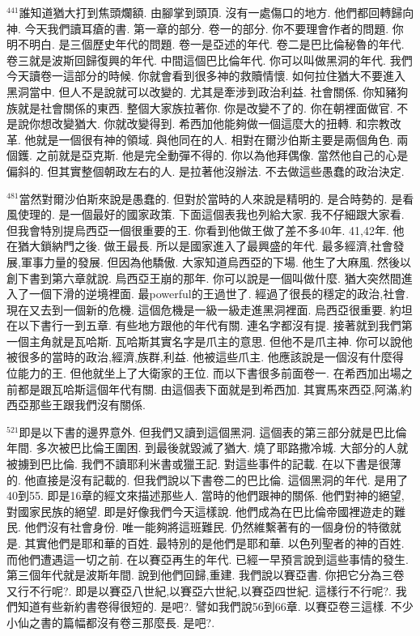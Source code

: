 \documentclass{book}
\begin{document}
$^{441}$誰知道猶大打到焦頭爛額.
由腳掌到頭頂.
沒有一處傷口的地方.
他們都回轉歸向神.
今天我們讀耳瘡的書.
第一章的部分.
卷一的部分.
你不要理會作者的問題.
你明不明白.
是三個歷史年代的問題.
卷一是亞述的年代.
卷二是巴比倫秘魯的年代.
卷三就是波斯回歸復興的年代.
中間這個巴比倫年代.
你可以叫做黑洞的年代.
我們今天讀卷一這部分的時候.
你就會看到很多神的救贖情懷.
如何拉住猶大不要進入黑洞當中.
但人不是說就可以改變的.
尤其是牽涉到政治利益.
社會關係.
你知豬狗族就是社會關係的東西.
整個大家族拉著你.
你是改變不了的.
你在朝裡面做官.
不是說你想改變猶大.
你就改變得到.
希西加他能夠做一個這麼大的扭轉.
和宗教改革.
他就是一個很有神的領域.
與他同在的人.
相對在爾沙伯斯主要是兩個角色.
兩個鑊.
之前就是亞克斯.
他是完全動彈不得的.
你以為他拜偶像.
當然他自己的心是偏斜的.
但其實整個朝政左右的人.
是拉著他沒辦法.
不去做這些愚蠢的政治決定.

$^{481}$當然對爾沙伯斯來說是愚蠢的.
但對於當時的人來說是精明的.
是合時勢的.
是看風使理的.
是一個最好的國家政策.
下面這個表我也列給大家.
我不仔細跟大家看.
但我會特別提烏西亞一個很重要的王.
你看到他做王做了差不多40年.
41,42年.
他在猶大鎖納門之後.
做王最長.
所以是國家進入了最興盛的年代.
最多經濟,社會發展,軍事力量的發展.
但因為他驕傲.
大家知道烏西亞的下場.
他生了大麻風.
然後以創下書到第六章就說.
烏西亞王崩的那年.
你可以說是一個叫做什麼.
猶大突然間進入了一個下滑的逆境裡面.
最powerful的王過世了.
經過了很長的穩定的政治,社會.
現在又去到一個新的危機.
這個危機是一級一級走進黑洞裡面.
烏西亞很重要.
約坦在以下書行一到五章.
有些地方跟他的年代有關.
連名字都沒有提.
接著就到我們第一個主角就是瓦哈斯.
瓦哈斯其實名字是爪主的意思.
但他不是爪主神.
你可以說他被很多的當時的政治,經濟,族群,利益.
他被這些爪主.
他應該說是一個沒有什麼得位能力的王.
但他就坐上了大衛家的王位.
而以下書很多前面卷一.
在希西加出場之前都是跟瓦哈斯這個年代有關.
由這個表下面就是到希西加.
其實馬來西亞,阿滿,約西亞那些王跟我們沒有關係.

$^{521}$即是以下書的邊界意外.
但我們又讀到這個黑洞.
這個表的第三部分就是巴比倫年間.
多次被巴比倫王圍困.
到最後就毀滅了猶大.
燒了耶路撒冷城.
大部分的人就被擄到巴比倫.
我們不讀耶利米書或獵王記.
對這些事件的記載.
在以下書是很薄的.
他直接是沒有記載的.
但我們說以下書卷二的巴比倫.
這個黑洞的年代.
是用了40到55.
即是16章的經文來描述那些人.
當時的他們跟神的關係.
他們對神的絕望,對國家民族的絕望.
即是好像我們今天這樣說.
他們成為在巴比倫帝國裡遊走的難民.
他們沒有社會身份.
唯一能夠將這班難民.
仍然維繫著有的一個身份的特徵就是.
其實他們是耶和華的百姓.
最特別的是他們是耶和華.
以色列聖者的神的百姓.
而他們遭遇這一切之前.
在以賽亞再生的年代.
已經一早預言說到這些事情的發生.
第三個年代就是波斯年間.
說到他們回歸,重建.
我們說以賽亞書.
你把它分為三卷又行不行呢?.
即是以賽亞八世紀,以賽亞六世紀,以賽亞四世紀.
這樣行不行呢?.
我們知道有些新約書卷得很短的.
是吧?.
譬如我們說56到66章.
以賽亞卷三這樣.
不少小仙之書的篇幅都沒有卷三那麼長.
是吧?.
\end{document}
